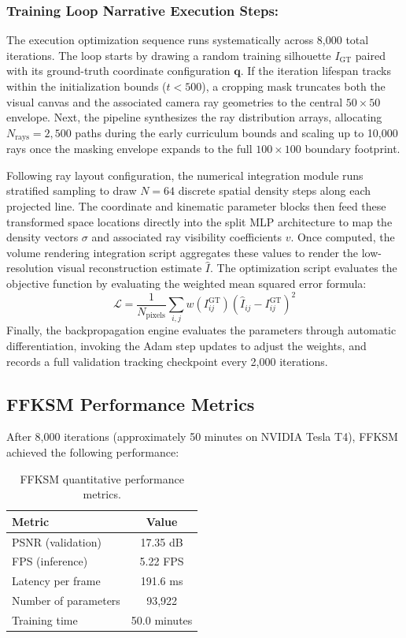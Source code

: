 \documentclass[12pt,a4paper,oneside]{report}
\begin{document}
\subsubsection{Training Loop Narrative Execution Steps:}
The execution optimization sequence runs systematically across 8,000 total iterations. The loop starts by drawing a random training silhouette $I_{\text{GT}}$ paired with its ground-truth coordinate configuration $\mathbf{q}$. If the iteration lifespan tracks within the initialization bounds ($t < 500$), a cropping mask truncates both the visual canvas and the associated camera ray geometries to the central $50 \times 50$ envelope. Next, the pipeline synthesizes the ray distribution arrays, allocating $N_{\text{rays}} = 2,500$ paths during the early curriculum bounds and scaling up to 10,000 rays once the masking envelope expands to the full $100 \times 100$ boundary footprint. 

Following ray layout configuration, the numerical integration module runs stratified sampling to draw $N=64$ discrete spatial density steps along each projected line. The coordinate and kinematic parameter blocks then feed these transformed space locations directly into the split MLP architecture to map the density vectors $\sigma$ and associated ray visibility coefficients $v$. Once computed, the volume rendering integration script aggregates these values to render the low-resolution visual reconstruction estimate $\hat{I}$. The optimization script evaluates the objective function by evaluating the weighted mean squared error formula:
\begin{equation}
\mathcal{L} = \frac{1}{N_{\text{pixels}}} \sum_{i,j} w(I_{ij}^{\text{GT}}) (\hat{I}_{ij} - I_{ij}^{\text{GT}})^2
\end{equation}
Finally, the backpropagation engine evaluates the parameters through automatic differentiation, invoking the Adam step updates to adjust the weights, and records a full validation tracking checkpoint every 2,000 iterations.

\subsection{FFKSM Performance Metrics}
\label{subsec:ffksm_performance_metrics}

After 8,000 iterations (approximately 50 minutes on NVIDIA Tesla T4), FFKSM achieved the following performance:

\begin{table}[H]
\centering
\caption{FFKSM quantitative performance metrics.}
\label{tab:ffksm_performance}
\begin{tabular}{lc}
\toprule
Metric & Value \\
\midrule
PSNR (validation) & 17.35 dB \\
FPS (inference) & 5.22 FPS \\
Latency per frame & 191.6 ms \\
Number of parameters & 93,922 \\
Training time & 50.0 minutes \\
\bottomrule
\end{tabular}
\end{table}
\end{document}
